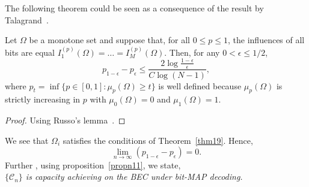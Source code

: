 \documentclass[
11pt, %
a4paper, %
oneside, %
headinclude,footinclude, %
BCOR5mm, %
]{scrartcl}
\begin{document}
The following theorem could be seen as a consequence of the result by Talagrand~\cite{talagrand}.
\begin{theorem}
Let $\Omega$ be a monotone set and suppose that, for all $0 \le p \le 1$, the influences of all bits are equal $I_1^{(p)}(\Omega) = \ldots = I_M^{(p)}(\Omega)$. Then, for any $0 < \epsilon \le 1/2$, $$p_{1-\epsilon} - p_\epsilon \le \frac{2 \log \frac{1-\epsilon}{\epsilon}}{C\log (N-1)},$$ where $p_t = \inf\{p \in [0,1] : \mu_p (\Omega) \ge t\}$ is well defined because $\mu_p(\Omega)$ is strictly increasing in $p$ with $\mu_0(\Omega) = 0$ and $\mu_1(\Omega)=1$.
\label{thm19}
\end{theorem}
\begin{proof}
Using Russo's lemma~\cite{russo}.
\end{proof}
We see that $\Omega_i$ satisfies the conditions of Theorem~\ref{thm19}.
Hence,\\$$\lim_{n \to \infty} (p_{1-\epsilon} - p_\epsilon) = 0.$$
Further , using proposition~\ref{propn11}, we state,\emph{\\$\{\mathcal{C}_n\}$ is capacity achieving on the BEC under bit-MAP decoding.}


\newpage
\renewcommand{\refname}{\spacedlowsmallcaps{References}} %




\end{document}
